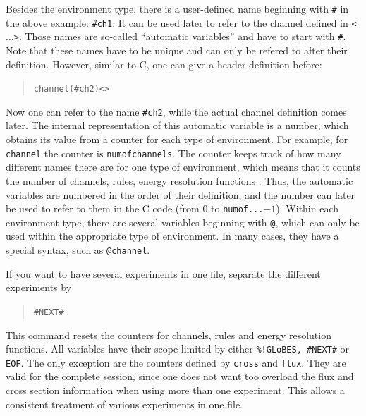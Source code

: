 Besides the environment type, there is a user-defined name 
beginning with {\tt \#}
in the above example: {\tt \#ch1}. It can be used later to refer to the 
channel defined in {\tt <$\ldots$>}. Those names are so-called 
``automatic variables'' and have to start with {\tt \#}. Note that these names have to be unique and can only be refered to after their definition.
However, similar to C, one can give a header definition before:
\begin{quote}
{\tt    channel(\#ch2)<>}
\end{quote}
Now one can refer to the name {\tt \#ch2}, while the actual channel definition comes later. The internal representation of this automatic
variable is a number, which obtains its value from a counter for each type of environment. For example, for {\tt channel} the counter is {\tt numofchannels}. The counter keeps track of how many different names 
there are for one type of environment, which means that it counts the number of channels, rules, energy resolution functions \etc . Thus, the automatic
variables are numbered in the order of their definition, and the number
can later be used to refer to them in the C code (from $0$ to {\tt numof...}$-1$). Within each environment type, there are several 
variables beginning with {\tt @}, which can only be used within the 
appropriate type of environment. In many cases, 
they have a special syntax, such as {\tt @channel}.          

If you want to have several experiments in one file, separate the different
 experiments by 
\begin{quote}
{\tt    \#NEXT\#}
\end{quote}
This command resets the counters for channels, rules and energy resolution
functions. All variables have their scope limited 
by either {\tt \%!GLoBES, \#NEXT\#} or {\tt EOF}. The only exception are 
the counters defined by {\tt cross} and {\tt flux}. They are valid for 
the complete session, since one does not want too overload the flux and 
cross section information when using more than one experiment. This allows 
a consistent treatment of various experiments in one file.

